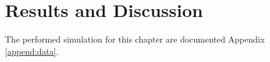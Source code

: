 
\chapter{Results and Discussion}
\label{chap:results}

\thispagestyle{empty}
\newpage

The performed simulation for this chapter are documented Appendix \ref{append:data}.
